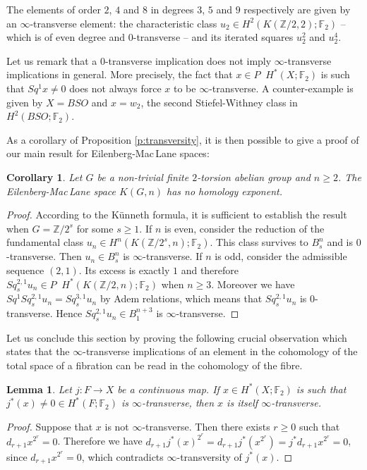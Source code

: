 \documentclass{amsart}
\newtheorem{lem}[thm]{Lemma}
\newtheorem{cor}[thm]{Corollary}
\theoremstyle{definition}
\theoremstyle{remark}
\DeclareMathOperator{\even}{^{even}}
\newcommand{\Z}{\mathbb{Z}}
\newcommand{\F}{\mathbb{F}}
\renewcommand{\geq}{\geqslant}
\begin{document}
The elements of order $2$, $4$ and $8$ in degrees $3$, $5$ and $9$ respectively are given by an $\infty$-transverse element: the characteristic class $u_2\in H^2(K(\Z/2,2);\F_2)$ -- which is of even degree and $0$-transverse -- and its iterated squares $u_2^2$ and $u_2^4$.

\newpage
Let us remark that a $0$-transverse implication does not imply $\infty$-transverse implications in general. More precisely, the fact that $x\in P\even H^*(X;\F_2)$ is such that $Sq^1x\not=0$ does not always force $x$ to be $\infty$-transverse. A counter-example is given by $X=BSO$ and $x=w_2$, the second Stiefel-Withney class in $H^2(BSO;\F_2)$.

As a corollary of Proposition \ref{p:transversity}, it is then possible to give a proof of our main result for Eilenberg-Mac\,Lane spaces:

\begin{cor}\label{c:GEM_no_exp}
Let $G$ be a non-trivial finite $2$-torsion abelian group and $n\geq2$. The Eilenberg-Mac\,Lane space $K(G,n)$ has no homology exponent.
\end{cor}

\begin{proof}
According to the K\"unneth formula, it is sufficient to establish the result when $G=\Z/2^s$ for some $s\geq1$. If $n$ is even, consider the reduction of the fundamental class $u_n\in H^n(K(\Z/2^s,n);\F_2)$. This class survives to $B^n_s$ and is $0$-transverse. Then $u_n\in B^n_s$ is $\infty$-transverse. If $n$ is odd, consider the admissible sequence $(2,1)$. Its excess is exactly $1$ and therefore $Sq^{2,1}_s u_n\in P\even H^*(K(\Z/2,n);\F_2)$ when $n\geq3$. Moreover we have $Sq^1Sq^{2,1}_s u_n=Sq^{3,1}_s u_n$ by Adem relations, which means that $Sq^{2,1}_s u_n$ is $0$-transverse. Hence $Sq^{2,1}_s u_n\in B^{n+3}_1$ is $\infty$-transverse.
\end{proof}

Let us conclude this section by proving the following crucial observation which states that the $\infty$-transverse implications of an element in the cohomology of the total space of a fibration can be read in the cohomology of the fibre. 

\begin{lem}
Let $j:F\to X$ be a continuous map. If $x\in H^*(X;\F_2)$ is such that $j^*(x)\not=0\in H^*(F;\F_2)$ is $\infty$-transverse, then $x$ is itself $\infty$-transverse.
\end{lem}

\begin{proof} %
Suppose that $x$ is not $\infty$-transverse. Then there exists $r\geq0$ such that $d_{r+1}x^{2^r}=0$. Therefore we have $d_{r+1}j^*(x)^{2^r}=d_{r+1}j^*(x^{2^r})=j^*d_{r+1}x^{2^r}=0$, since $d_{r+1}x^{2^r}=0$, which contradicts $\infty$-transversity of $j^*(x)$.
\end{proof}
\end{document}

